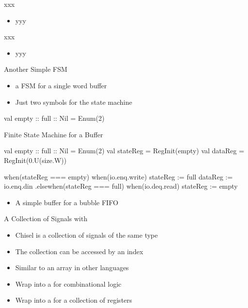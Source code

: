 \begin{frame}[fragile]{xxx}
\begin{itemize}
\item yyy
\end{itemize}
\end{frame}


\begin{frame}[fragile]{xxx}
\begin{itemize}
\item yyy
\end{itemize}
\end{frame}

\begin{frame}[fragile]{Another Simple FSM}
\begin{itemize}
\item a FSM for a single word buffer
\item Just two symbols for the state machine
\end{itemize}
\begin{chisel}
  val empty :: full :: Nil = Enum(2)
\end{chisel}
\end{frame}

\begin{frame}[fragile]{Finite State Machine for a Buffer}
\begin{chisel}
  val empty :: full :: Nil = Enum(2)
  val stateReg = RegInit(empty)
  val dataReg = RegInit(0.U(size.W))

  when(stateReg === empty) {
    when(io.enq.write) {
      stateReg := full
      dataReg := io.enq.din
    }
  }.elsewhen(stateReg === full) {
    when(io.deq.read) {
      stateReg := empty
    }
  }
\end{chisel}
\begin{itemize}
\item A simple buffer for a bubble FIFO
\end{itemize}
\end{frame}

\begin{frame}[fragile]{A Collection of Signals with }
\begin{itemize}
\item Chisel  is a collection of signals of the same type
\item The collection can be accessed by an index
\item Similar to an array in other languages
\item Wrap into a  for combinational logic
\item Wrap into a  for a collection of registers
\end{itemize}
\end{frame}

